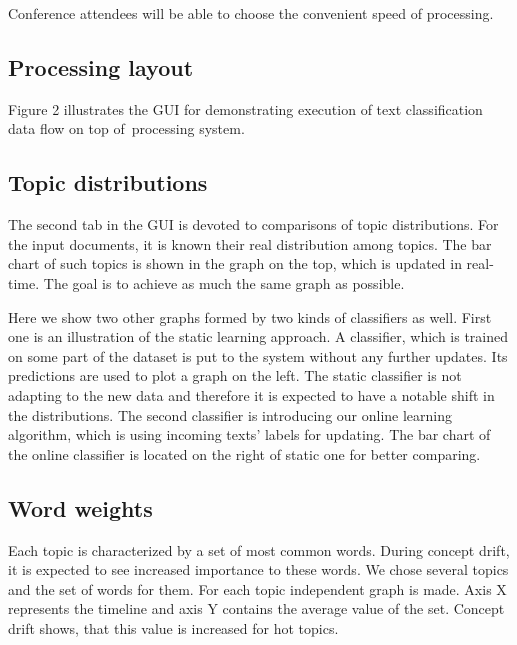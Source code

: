 Conference attendees will be able to choose the convenient speed of processing.



\subsection{Processing layout}
Figure 2 illustrates the GUI for demonstrating execution of text classification data flow on top of~\FlameStream processing system. 

\subsection{Topic distributions}

The second tab in the GUI is devoted to comparisons of topic distributions. For the input documents, it is known their real distribution among topics. The bar chart of such topics is shown in the graph on the top, which is updated in real-time. The goal is to achieve as much the same graph as possible. 

Here we show two other graphs formed by two kinds of classifiers as well. First one is an illustration of the static learning approach. A classifier, which is trained on some part of the dataset is put to the system without any further updates. Its predictions are used to plot a graph on the left. The static classifier is not adapting to the new data and therefore it is expected to have a notable shift in the distributions. The second classifier is introducing our online learning algorithm, which is using incoming texts' labels for updating. The bar chart of the online classifier is located on the right of static one for better comparing.

\subsection{Word weights}

Each topic is characterized by a set of most common words. During concept drift, it is expected to see increased importance to these words. We chose several topics and the set of words for them. For each topic independent graph is made. Axis X represents the timeline and axis Y contains the average value of the set. Concept drift shows, that this value is increased for hot topics.

